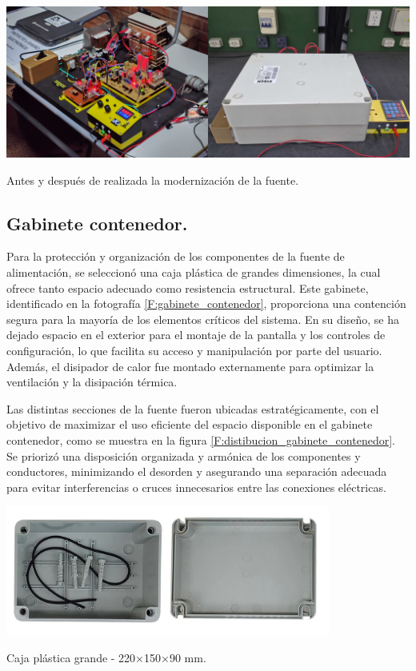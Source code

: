 \begin{foto}[H]
    \centering
    \includegraphics[scale=0.05]{./imagenes/fuente_anterior.jpg}
    \caption{Antes y después de realizada la modernización de la fuente.}
    \label{F:fuente_anterior}
\end{foto}

\subsection{Gabinete contenedor.}
Para la protección y organización de los componentes de la fuente de alimentación, se seleccionó una caja plástica de grandes dimensiones, la cual ofrece tanto espacio adecuado como resistencia estructural. Este gabinete, identificado en la fotografía \ref{F:gabinete_contenedor}, proporciona una contención segura para la mayoría de los elementos críticos del sistema. En su diseño, se ha dejado espacio en el exterior para el montaje de la pantalla y los controles de configuración, lo que facilita su acceso y manipulación por parte del usuario. Además, el disipador de calor fue montado externamente para optimizar la ventilación y la disipación térmica.\par
Las distintas secciones de la fuente fueron ubicadas estratégicamente, con el objetivo de maximizar el uso eficiente del espacio disponible en el gabinete contenedor, como se muestra en la figura \ref{F:distibucion_gabinete_contenedor}. Se priorizó una disposición organizada y armónica de los componentes y conductores, minimizando el desorden y asegurando una separación adecuada para evitar interferencias o cruces innecesarios entre las conexiones eléctricas.

\begin{foto}[H]
    \centering
    \includegraphics[width=0.8\textwidth]{./imagenes/caja_plastica.jpg}
    \caption{Caja plástica grande - 220×150×90 mm.}
    \label{F:gabinete_contenedor}
\end{foto}

